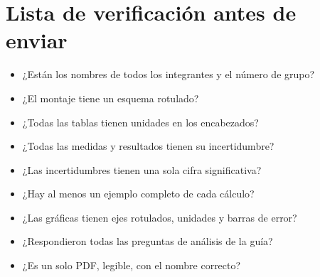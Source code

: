 \documentclass[11pt, letterpaper]{article}
\begin{document}
	\section{Lista de verificación antes de enviar}
	
	\begin{itemize}
		\item[$\square$] ¿Están los nombres de todos los integrantes y el número de
		grupo?
		\item[$\square$] ¿El montaje tiene un esquema rotulado?
		\item[$\square$] ¿Todas las tablas tienen unidades en los encabezados?
		\item[$\square$] ¿Todas las medidas y resultados tienen su incertidumbre?
		\item[$\square$] ¿Las incertidumbres tienen una sola cifra significativa?
		\item[$\square$] ¿Hay al menos un ejemplo completo de cada cálculo?
		\item[$\square$] ¿Las gráficas tienen ejes rotulados, unidades y barras de
		error?
		\item[$\square$] ¿Respondieron todas las preguntas de análisis de la guía?
		\item[$\square$] ¿Es un solo PDF, legible, con el nombre correcto?
	\end{itemize}
	
	
	
\end{document}

